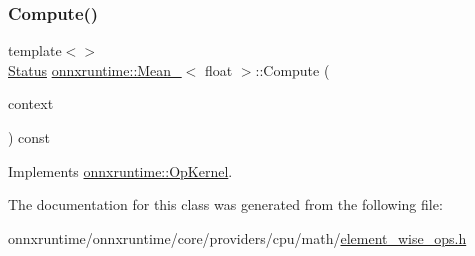 \subsubsection{\texorpdfstring{Compute()}{Compute()}\hspace{0.1cm}{\footnotesize\ttfamily [2/2]}}
{\footnotesize\ttfamily template$<$$>$ \\
\mbox{\hyperlink{classonnxruntime_1_1common_1_1Status}{Status}} \mbox{\hyperlink{classonnxruntime_1_1Mean__8}{onnxruntime\+::\+Mean\+\_}}$<$ float $>$\+::Compute (\begin{DoxyParamCaption}\item[{\mbox{\hyperlink{classonnxruntime_1_1OpKernelContext}{Op\+Kernel\+Context}} $\ast$}]{context }\end{DoxyParamCaption}) const\hspace{0.3cm}{\ttfamily [virtual]}}



Implements \mbox{\hyperlink{classonnxruntime_1_1OpKernel_a9eca8656a78b1b3ab9d3351a12798650}{onnxruntime\+::\+Op\+Kernel}}.



The documentation for this class was generated from the following file\+:\begin{DoxyCompactItemize}
\item 
onnxruntime/onnxruntime/core/providers/cpu/math/\mbox{\hyperlink{element__wise__ops_8h}{element\+\_\+wise\+\_\+ops.\+h}}\end{DoxyCompactItemize}
